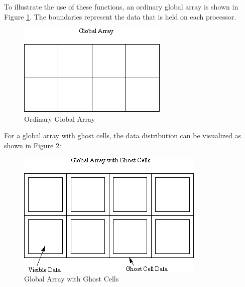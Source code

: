 To illustrate the use of these functions, an ordinary global array is shown in
Figure \ref{cap:OrdinaryGlobalArray}. The boundaries represent the data that is
held on each processor.

\begin{figure}
\begin{centering}
\includegraphics[width=0.9\columnwidth]{ghost003}
\caption{Ordinary Global Array}
\label{cap:OrdinaryGlobalArray}
\end{centering}
\end{figure}

For a global array with ghost cells, the data distribution can be visualized as
shown in Figure \ref{cap:GAwGhostCells}:

\begin{figure}
\begin{centering}
\includegraphics[width=0.9\columnwidth]{ghost006}
\caption{Global Array with Ghost Cells}
\label{cap:GAwGhostCells}
\end{centering}
\end{figure}

